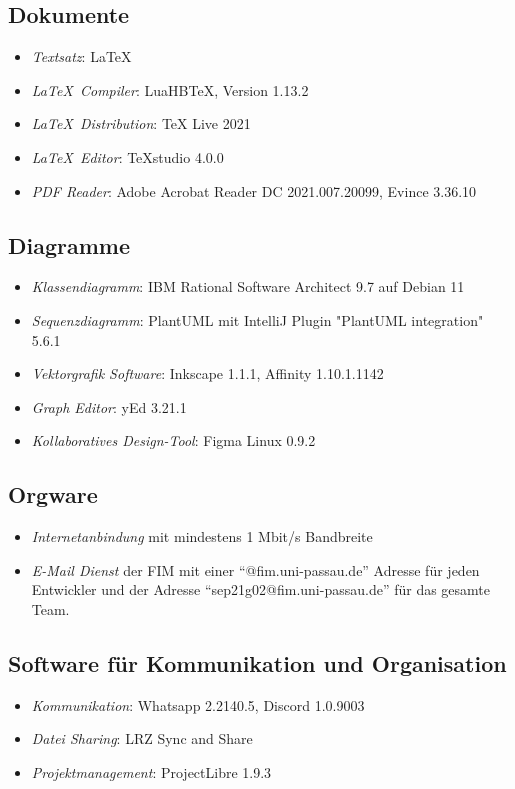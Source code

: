 \subsection{Dokumente}
\begin{itemize}
	\item \emph{Textsatz}: \LaTeX
	\item \emph{\LaTeX\ Compiler}: LuaHBTeX, Version 1.13.2
	\item \emph{\LaTeX\ Distribution}: TeX Live 2021
	\item \emph{\LaTeX\ Editor}: TeXstudio 4.0.0
	\item \emph{PDF Reader}: Adobe Acrobat Reader DC 2021.007.20099, Evince 3.36.10
\end{itemize}
\subsection{Diagramme}
\begin{itemize}
	\item \emph{Klassendiagramm}: IBM Rational Software Architect 9.7 auf Debian 11
	\item \emph{Sequenzdiagramm}: PlantUML mit IntelliJ Plugin "PlantUML integration" 5.6.1
	\item \emph{Vektorgrafik Software}: Inkscape 1.1.1, Affinity 1.10.1.1142
	\item \emph{Graph Editor}: yEd 3.21.1
	\item \emph{Kollaboratives Design-Tool}: Figma Linux 0.9.2
\end{itemize}
\subsection{Orgware}
\begin{itemize}
	\item \emph{Internetanbindung} mit mindestens 1 Mbit/s Bandbreite
	\item \emph{E-Mail Dienst} der FIM mit einer ``@fim.uni-passau.de'' Adresse für jeden Entwickler und der Adresse ``sep21g02@fim.uni-passau.de'' für das gesamte Team.
\end{itemize}
\subsection{Software für Kommunikation und Organisation}
\begin{itemize}
	\item \emph{Kommunikation}: Whatsapp 2.2140.5, Discord 1.0.9003
	\item \emph{Datei Sharing}: LRZ Sync and Share
	\item \emph{Projektmanagement}: ProjectLibre 1.9.3
\end{itemize}